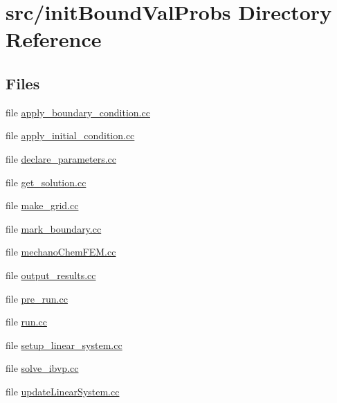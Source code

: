 \section{src/init\-Bound\-Val\-Probs Directory Reference}
\label{dir_b512e91881d8c7c428296179af4618db}
\subsection*{Files}
\begin{DoxyCompactItemize}
\item 
file \hyperlink{apply__boundary__condition_8cc}{apply\-\_\-boundary\-\_\-condition.\-cc}
\item 
file \hyperlink{apply__initial__condition_8cc}{apply\-\_\-initial\-\_\-condition.\-cc}
\item 
file \hyperlink{init_bound_val_probs_2declare__parameters_8cc}{declare\-\_\-parameters.\-cc}
\item 
file \hyperlink{get__solution_8cc}{get\-\_\-solution.\-cc}
\item 
file \hyperlink{make__grid_8cc}{make\-\_\-grid.\-cc}
\item 
file \hyperlink{mark__boundary_8cc}{mark\-\_\-boundary.\-cc}
\item 
file \hyperlink{mechano_chem_f_e_m_8cc}{mechano\-Chem\-F\-E\-M.\-cc}
\item 
file \hyperlink{output__results_8cc}{output\-\_\-results.\-cc}
\item 
file \hyperlink{pre__run_8cc}{pre\-\_\-run.\-cc}
\item 
file \hyperlink{run_8cc}{run.\-cc}
\item 
file \hyperlink{setup__linear__system_8cc}{setup\-\_\-linear\-\_\-system.\-cc}
\item 
file \hyperlink{solve__ibvp_8cc}{solve\-\_\-ibvp.\-cc}
\item 
file \hyperlink{update_linear_system_8cc}{update\-Linear\-System.\-cc}
\end{DoxyCompactItemize}
